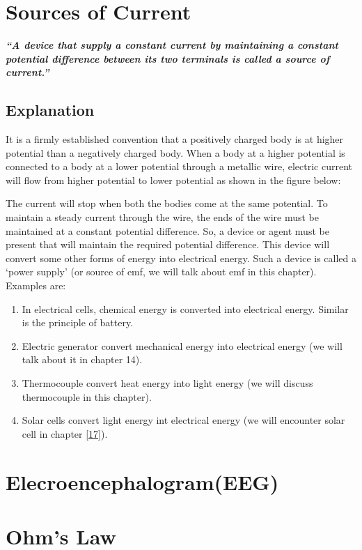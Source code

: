 \section{Sources of Current}
\textit{\textbf{``A device that supply a constant current by maintaining a constant potential difference between its two terminals is called a source of current.”}}
\subsection*{Explanation}
It is a firmly established convention that a positively charged body is at higher potential than a negatively charged body. When a body at a higher potential is connected to a body at a lower potential through a metallic wire, electric current will flow from higher potential to lower potential as shown in the figure below:


The current will stop when both the bodies come at the same potential. To maintain a steady current through the wire, the ends of the wire must be maintained at a constant potential difference. So, a device or agent must be present that will maintain the required potential difference. This device will convert some other forms of energy into electrical energy. Such a device is called a ‘power supply’ (or source of emf, we will talk about emf in this chapter). Examples are:
\begin{enumerate}[label=(\roman*)] 
    \item In electrical cells, chemical energy is converted into electrical energy.
    Similar is the principle of battery.
    \item Electric generator convert mechanical energy
    into electrical energy (we will talk about it in chapter 14).
    \item Thermocouple convert heat energy into light energy
    (we will discuss thermocouple in this chapter).
    \item Solar cells convert light energy int electrical
    energy (we will encounter solar cell in chapter \ref{17}).
\end{enumerate}

\section{Elecroencephalogram(EEG)}
\section{Ohm's Law}

